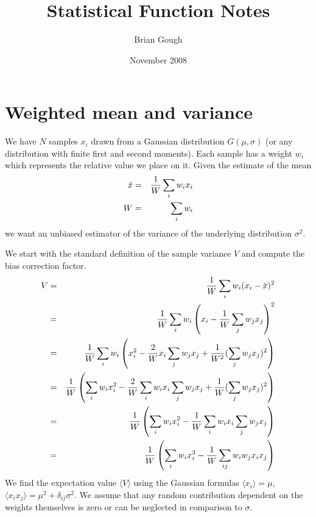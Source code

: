 \documentclass[fleqn,12pt]{article}
\newcommand{\expectation}[1]{\langle #1 \rangle}
\begin{document}
\title{Statistical Function Notes}
\author{Brian Gough}
\date{November 2008}
\maketitle

\section{Weighted mean and variance}
We have $N$ samples $x_i$ drawn from a Gaussian distribution
$G(\mu,\sigma)$ (or any distribution with finite first and second
moments).  Each sample has a weight $w_i$ which represents the
relative value we place on it.  Given the estimate of the mean
%
\begin{eqnarray}
\bar{x} &=& {1 \over W} \sum_i w_i x_i \\
W       &=& \sum_i w_i
\end{eqnarray}
%
\noindent
we want an unbiased estimator of the variance of the underlying
distribution $\sigma^2$.  

We start with the standard definition of the sample variance $V$ and
compute the bias correction factor.
%
\begin{eqnarray}
V &=& {1\over W} \sum_i w_i (x_i - \bar{x})^2 \\
  &=& {1\over W} \sum_i w_i \left(x_i - {1\over W}\sum_j w_j x_j\right)^2 \\
  &=& {1\over W} \sum_i w_i \left(x_i^2 - {2 \over W} x_i \sum_j w_j x_j 
       + {1 \over W^2} (\sum_j w_j x_j)^2\right) \\
  &=& {1\over W} \left( \sum_i w_i x_i^2 
       - {2 \over W} \sum_i w_i x_i \sum_j w_j x_j
       + {1 \over W} (\sum_j w_j x_j)^2\right)\\
  &=& {1\over W} \left( \sum_i w_i x_i^2 
       - {1 \over W} \sum_i w_i x_i \sum_j w_j x_j\right)\\
  &=& {1\over W} \left( \sum_i w_i x_i^2 
       - {1 \over W} \sum_{ij} w_i w_j x_i x_j\right)
\end{eqnarray}
%
We find the expectation value $\expectation{V}$ using the Gaussian
formulas $\expectation{x_i} = \mu$, $\expectation{x_i x_j} = \mu^2 +
\delta_{ij} \sigma^2$.  We assume that any random contribution
dependent on the weights themselves is zero or can be
neglected in comparison to $\sigma$.
\end{document}
